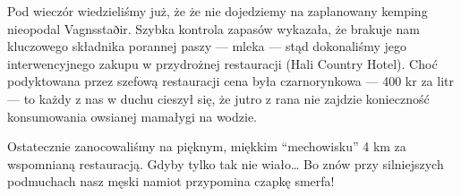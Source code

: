 Pod wieczór wiedzieliśmy już, że że nie dojedziemy na zaplanowany kemping nieopodal Vagnsstaðir. Szybka kontrola zapasów wykazała, że brakuje nam kluczowego składnika porannej paszy --- mleka --- stąd dokonaliśmy jego interwencyjnego zakupu w przydrożnej restauracji (Hali Country Hotel). Choć podyktowana przez szefową restauracji cena była czarnorynkowa --- 400 kr za litr --- to każdy z nas w duchu cieszył się, że jutro z rana nie zajdzie konieczność konsumowania owsianej mamałygi na wodzie.

Ostatecznie zanocowaliśmy na pięknym, miękkim “mechowisku” 4 km za wspomnianą restauracją. Gdyby tylko tak nie wiało… Bo znów przy silniejszych podmuchach nasz męski namiot przypomina czapkę smerfa!